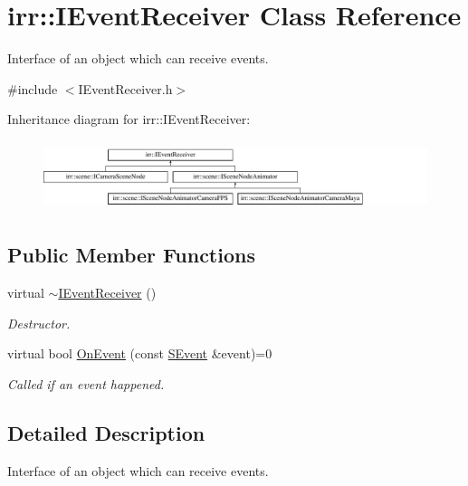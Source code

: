 \hypertarget{classirr_1_1IEventReceiver}{}\section{irr\+:\+:I\+Event\+Receiver Class Reference}
\label{classirr_1_1IEventReceiver}


Interface of an object which can receive events.  




{\ttfamily \#include $<$I\+Event\+Receiver.\+h$>$}

Inheritance diagram for irr\+:\+:I\+Event\+Receiver\+:\begin{figure}[H]
\begin{center}
\leavevmode
\includegraphics[height=2.043796cm]{classirr_1_1IEventReceiver}
\end{center}
\end{figure}
\subsection*{Public Member Functions}
\begin{DoxyCompactItemize}
\item 
virtual \hyperlink{classirr_1_1IEventReceiver_a4ec011612f02017d95654cf5b5d567b6}{$\sim$\+I\+Event\+Receiver} ()\hypertarget{classirr_1_1IEventReceiver_a4ec011612f02017d95654cf5b5d567b6}{}\label{classirr_1_1IEventReceiver_a4ec011612f02017d95654cf5b5d567b6}

\begin{DoxyCompactList}\small\item\em Destructor. \end{DoxyCompactList}\item 
virtual bool \hyperlink{classirr_1_1IEventReceiver_a571f744ceffc3b4fe8a81f529163eb97}{On\+Event} (const \hyperlink{structirr_1_1SEvent}{S\+Event} \&event)=0
\begin{DoxyCompactList}\small\item\em Called if an event happened. \end{DoxyCompactList}\end{DoxyCompactItemize}


\subsection{Detailed Description}
Interface of an object which can receive events. 

